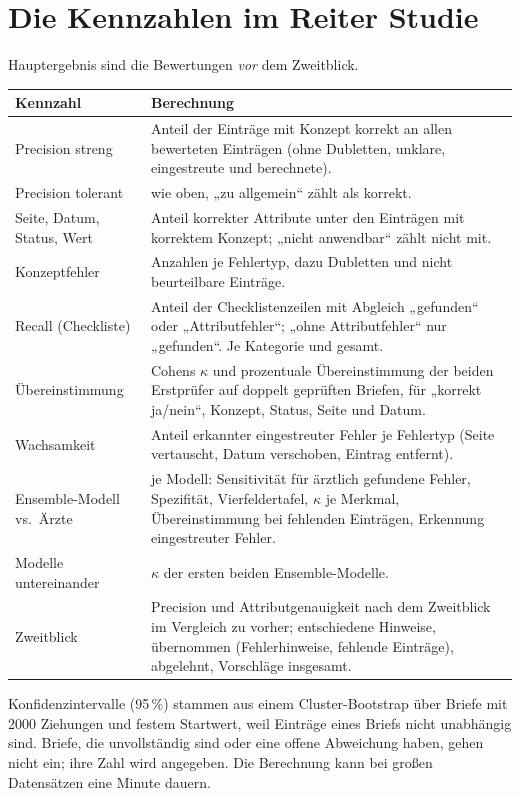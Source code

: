 \documentclass[11pt,a4paper,parskip=half-,headings=standardclasses,toc=bibliography,open=any]{scrreprt}
\begin{document}
\section{Die Kennzahlen im Reiter Studie}\label{sec:studienkennzahlen}

Hauptergebnis sind die Bewertungen \emph{vor} dem Zweitblick.

\begin{longtable}{@{}P{4.2cm}p{10.4cm}@{}}
\toprule
\textbf{Kennzahl} & \textbf{Berechnung}\\
\midrule
\endhead
Precision streng & Anteil der Einträge mit Konzept korrekt an allen bewerteten Einträgen (ohne Dubletten, unklare, eingestreute und berechnete).\\
Precision tolerant & wie oben, „zu allgemein“ zählt als korrekt.\\
Seite, Datum, Status, Wert & Anteil korrekter Attribute unter den Einträgen mit korrektem Konzept; „nicht anwendbar“ zählt nicht mit.\\
Konzeptfehler & Anzahlen je Fehlertyp, dazu Dubletten und nicht beurteilbare Einträge.\\
Recall (Checkliste) & Anteil der Checklistenzeilen mit Abgleich „gefunden“ oder „Attributfehler“; „ohne Attributfehler“ nur „gefunden“. Je Kategorie und gesamt.\\
Übereinstimmung & Cohens $\kappa$ und prozentuale Übereinstimmung der beiden Erstprüfer auf doppelt geprüften Briefen, für „korrekt ja/nein“, Konzept, Status, Seite und Datum.\\
Wachsamkeit & Anteil erkannter eingestreuter Fehler je Fehlertyp (Seite vertauscht, Datum verschoben, Eintrag entfernt).\\
Ensemble-Modell vs.\ Ärzte & je Modell: Sensitivität für ärztlich gefundene Fehler, Spezifität, Vierfeldertafel, $\kappa$ je Merkmal, Übereinstimmung bei fehlenden Einträgen, Erkennung eingestreuter Fehler.\\
Modelle untereinander & $\kappa$ der ersten beiden Ensemble-Modelle.\\
Zweitblick & Precision und Attributgenauigkeit nach dem Zweitblick im Vergleich zu vorher; entschiedene Hinweise, übernommen (Fehlerhinweise, fehlende Einträge), abgelehnt, Vorschläge insgesamt.\\
\bottomrule
\end{longtable}

Konfidenzintervalle (95\,\%) stammen aus einem Cluster-Bootstrap über Briefe mit 2000 Ziehungen und festem Startwert, weil Einträge eines Briefs nicht unabhängig sind. Briefe, die unvollständig sind oder eine offene Abweichung haben, gehen nicht ein; ihre Zahl wird angegeben. Die Berechnung kann bei großen Datensätzen eine Minute dauern.
\end{document}

